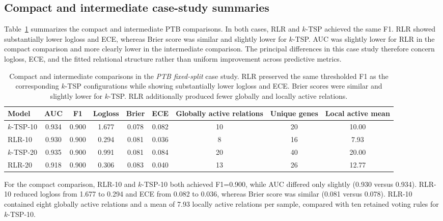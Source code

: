 \documentclass[11pt, a4paper]{article}
\newcommand{\stdtablefont}{\small}
\newcommand{\stdtablelayout}{%
  \stdtablefont
  \setlength{\tabcolsep}{4pt}
  \renewcommand{\arraystretch}{1.2}
}
\begin{document}
\subsection{Compact and intermediate case-study summaries}

Table~\ref{tab:ptb_case_summary} summarizes the compact and intermediate PTB comparisons. In both cases, RLR and $k$-TSP achieved the same F1. RLR showed substantially lower logloss and ECE, whereas Brier score was similar and slightly lower for $k$-TSP. AUC was slightly lower for RLR in the compact comparison and more clearly lower in the intermediate comparison. The principal differences in this case study therefore concern logloss, ECE, and the fitted relational structure rather than uniform improvement across predictive metrics.

\begin{table}[!htbp]
\centering
\caption{Compact and intermediate comparisons in the \emph{PTB fixed-split} case study. RLR preserved the same thresholded F1 as the corresponding $k$-TSP configurations while showing substantially lower logloss and ECE. Brier scores were similar and slightly lower for $k$-TSP. RLR additionally produced fewer globally and locally active relations.}
\label{tab:ptb_case_summary}
{\stdtablelayout
\begin{adjustbox}{max width=\linewidth}
\begin{tabular}{lcccccccc}
\toprule
\textbf{Model} &
\textbf{AUC} &
\textbf{F1} &
\textbf{Logloss} &
\textbf{Brier} &
\textbf{ECE} &
\textbf{Globally active relations} &
\textbf{Unique genes} &
\textbf{Local active mean} \\
\midrule
$k$-TSP-10 & 0.934 & 0.900 & 1.677 & 0.078 & 0.082 & 10 & 20 & 10.00 \\
RLR-10     & 0.930 & 0.900 & 0.294 & 0.081 & 0.036 & 8  & 16 & 7.93 \\
\midrule
$k$-TSP-20 & 0.935 & 0.900 & 0.991 & 0.081 & 0.084 & 20 & 40 & 20.00 \\
RLR-20     & 0.918 & 0.900 & 0.306 & 0.083 & 0.040 & 13 & 26 & 12.77 \\
\bottomrule
\end{tabular}
\end{adjustbox}
}
\end{table}

For the compact comparison, RLR-10 and $k$-TSP-10 both achieved F1=0.900, while AUC differed only slightly (0.930 versus 0.934). RLR-10 reduced logloss from 1.677 to 0.294 and ECE from 0.082 to 0.036, whereas Brier score was similar (0.081 versus 0.078). RLR-10 contained eight globally active relations and a mean of 7.93 locally active relations per sample, compared with ten retained voting rules for $k$-TSP-10.
\end{document}
